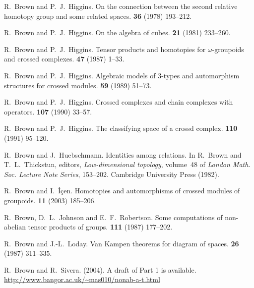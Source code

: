 \begin{thebibliography}{notes}
R.~Brown and P.~J.~Higgins.
\newblock On the connection between the second relative homotopy group and some
  related spaces.
 {\bf 36} (1978) 193--212.

R.~Brown and P.~J.~Higgins.
\newblock On the algebra of cubes.
 {\bf 21} (1981) 233--260.

R.~Brown and P.~J.~Higgins.
\newblock Tensor products and homotopies for $\omega$-groupoids and crossed
  complexes.
 {\bf 47} (1987) 1--33.

R.~Brown and P.~J.~Higgins.
\newblock Algebraic models of $3$-types and automorphism structures for crossed
  modules.
 {\bf 59} (1989) 51--73.

R.~Brown and P.~J.~Higgins.
\newblock Crossed complexes and chain complexes with operators.
 {\bf 107} (1990) 33--57.

R.~Brown and P.~J.~Higgins.
\newblock The classifying space of a crossd complex.
 {\bf 110} (1991) 95--120.

R.~Brown and J.~Huebschmann.
\newblock Identities among relations.
\newblock In R.~Brown and T.~L.~Thickstun, editors, {\em Low-dimensional
  topology\/}, volume~48 of {\em London Math. Soc. Lecture Note Series\/},
  153--202. Cambridge University Press (1982).

R.~Brown and I.~\.{I}\c{c}en.
\newblock Homotopies and automorphisms of crossed modules of groupoids.
 {\bf 11} (2003) 185--206.

R.~Brown, D.~L.~Johnson and E.~F.~Robertson.
\newblock Some computations of non-abelian tensor products of groups.
 {\bf 111} (1987) 177--202.

R.~Brown and J.-L.~Loday.
\newblock Van Kampen theorems for diagram of spaces.
 {\bf 26} (1987) 311--335.

R.~Brown and R.~Sivera.
 (2004).
\newblock A draft of Part 1 is available.
\newline\urlprefix\url{http://www.bangor.ac.uk/~mas010/nonab-a-t.html}


\end{thebibliography}
